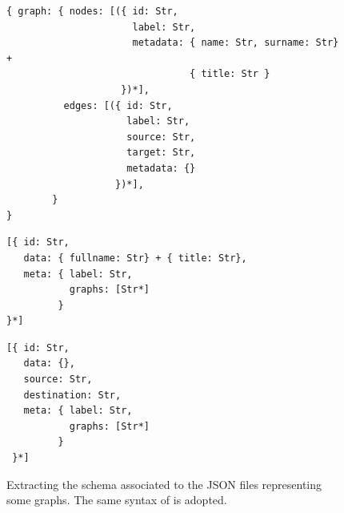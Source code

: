 \begin{figure}[!p]
	\begin{minipage}[t]{\textwidth}
		\begin{lstlisting}[language=theoryjson,basicstyle=\ttfamily\small]
{ graph: { nodes: [({ id: Str,
                      label: Str,
                      metadata: { name: Str, surname: Str} + 
                                { title: Str }
		            })*],
		  edges: [({ id: Str,
		             label: Str,
		             source: Str,
		             target: Str,
		             metadata: {}
		           })*],
		}
}
		\end{lstlisting}
		\label{fig:ajsongraphformat}
	\end{minipage}
	
	\begin{minipage}[t]{\textwidth}
		\begin{lstlisting}[language=theoryjson,basicstyle=\ttfamily\small]
[{ id: Str,
   data: { fullname: Str} + { title: Str},
   meta: { label: Str,
           graphs: [Str*]
		 }
}*]
		\end{lstlisting}
		\label{fig:agravertex}
	\end{minipage}
	
	\begin{minipage}[t]{\textwidth}
		\begin{lstlisting}[language=theoryjson,basicstyle=\ttfamily\small]
[{ id: Str,
   data: {},
   source: Str,
   destination: Str,
   meta: { label: Str,
           graphs: [Str*]
		 }
 }*]
		\end{lstlisting}
		\label{fig:agraedge}
	\end{minipage}
	\caption{Extracting the schema associated to the JSON files representing some graphs. The same syntax of \cite{BaaziziLCGS17} is adopted.}
	\label{fig:ajsongraphrepr}
\end{figure}



